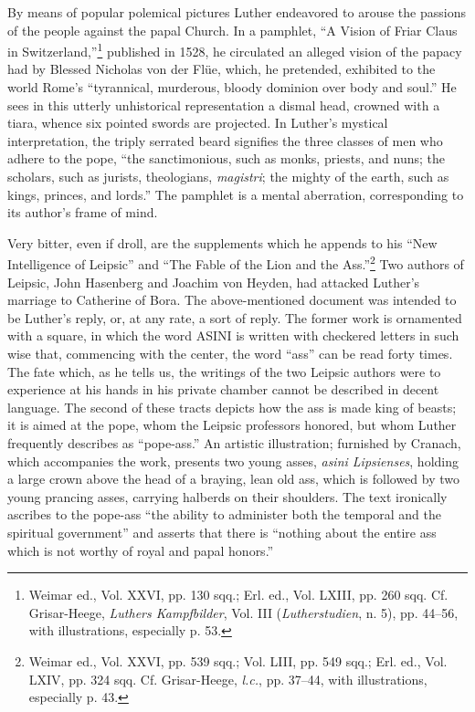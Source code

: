 By means of popular polemical pictures Luther endeavored to
arouse the passions of the people against the papal Church. In a pamphlet,
“A Vision of Friar Claus in Switzerland,”\footnote
{Weimar ed., Vol. XXVI, pp. 130 sqq.; Erl. ed., Vol. LXIII, pp. 260 sqq.
Cf. Grisar-Heege, \textit{Luthers Kampfbilder}, Vol. III (\textit{Lutherstudien},
n. 5), pp. 44--56, with illustrations,
especially p. 53.}
published in 1528,
he circulated an alleged vision of the papacy had by Blessed Nicholas
von der Flüe, which, he pretended, exhibited to the world Rome’s
“tyrannical, murderous, bloody dominion over body and soul.” He
sees in this utterly unhistorical representation a dismal head, crowned
with a tiara, whence six pointed swords are projected. In Luther’s
mystical interpretation, the triply serrated beard signifies the three
classes of men who adhere to the pope, “the sanctimonious, such as
monks, priests, and nuns; the scholars, such as jurists, theologians,
\textit{magistri}; the mighty of the earth, such as kings, princes, and lords.”
The pamphlet is a mental aberration, corresponding to its author’s
frame of mind.

Very bitter, even if droll, are the supplements which he appends
to his “New Intelligence of Leipsic” and “The Fable of the Lion and
the Ass.”\footnote
{Weimar ed., Vol. XXVI, pp. 539 sqq.; Vol. LIII, pp. 549 sqq.; Erl. ed., Vol. LXIV, pp.
324 sqq. Cf. Grisar-Heege, \textit{l.c.}, pp. 37--44, with illustrations, especially p. 43.}
Two authors of Leipsic, John Hasenberg and Joachim
von Heyden, had attacked Luther’s marriage to Catherine of Bora.
The above-mentioned document was intended to be Luther’s reply,
or, at any rate, a sort of reply. The former work is ornamented with
a square, in which the word ASINI is written with checkered letters
in such wise that, commencing with the center, the word “ass” can
be read forty times. The fate which, as he tells us, the writings of the
two Leipsic authors were to experience at his hands in his private
chamber cannot be described in decent language. The second of these
tracts depicts how the ass is made king of beasts; it is aimed at the pope,
whom the Leipsic professors honored, but whom Luther frequently
describes as “pope-ass.” An artistic illustration; furnished by Cranach,
which accompanies the work, presents two young asses, \textit{asini Lipsienses},
holding a large crown above the head of a braying, lean old ass, which
is followed by two young prancing asses, carrying halberds on their
shoulders. The text ironically ascribes to the pope-ass “the ability to
administer both the temporal and the spiritual government” and asserts
that there is “nothing about the entire ass which is not worthy
of royal and papal honors.”

